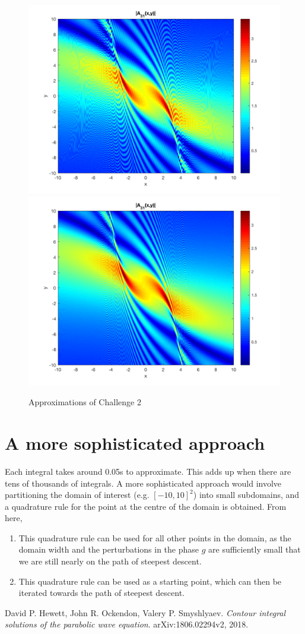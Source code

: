 \documentclass[12pt]{article}
\begin{document}
	\begin{figure}[h]
		\centering
		\includegraphics[width=0.45\linewidth]{../images/chal2_cheb250_quad_50}
		\includegraphics[width=0.45\linewidth]{../images/chal2_cheb1000_quad_50}
		\caption{Approximations of Challenge 2}
		\label{fig:chal2}
	\end{figure}

\section{A more sophisticated approach}

Each integral takes around 0.05s to approximate. This adds up when there are tens of thousands of integrals. A more sophisticated approach would involve partitioning the domain of interest (e.g. $[-10,10]^2$) into small subdomains, and a quadrature rule for the point at the centre of the domain is obtained. From here,
\begin{enumerate}
	\item This quadrature rule can be used for all other points in the domain, as the domain width and the perturbations in the phase $g$ are sufficiently small that we are still nearly on the path of steepest descent.
	\item This quadrature rule can be used as a starting point, which can then be iterated towards the path of steepest descent.
\end{enumerate}
	
	
	\begin{thebibliography}{9}
		David P. Hewett, John R. Ockendon, Valery P. Smyshlyaev. 
		\textit{Contour integral solutions of the parabolic wave equation}. 
		arXiv:1806.02294v2, 2018.
	\end{thebibliography}
\end{document}
